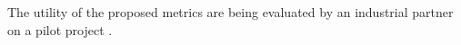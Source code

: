 The utility of the proposed metrics are being evaluated by an industrial partner on a pilot project .


